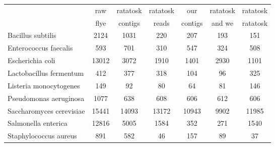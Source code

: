 \begin{minipage}{0.91\textwidth}
\begin{adjustbox}{center}
\begin{tabular}{|l||c|c|c|c|c|c|}
\hline
 & raw & ratatosk & ratatosk & our & ratatosk & ratatosk \\
 & flye & contigs & reads & contigs & and we & ratatosk \\
\hline
\hline
Bacillus subtilis & \cellcolor[RGB]{235, 71, 71} 2124 & \cellcolor[RGB]{235, 71, 71} 1031 & \cellcolor[RGB]{253, 241, 241} 220 & \cellcolor[RGB]{246, 246, 254} 207 & \cellcolor[RGB]{223, 223, 251} 193 & \cellcolor[RGB]{94, 94, 237} 151 \\
\hline
Enterococcus faecalis & \cellcolor[RGB]{253, 237, 237} 593 & \cellcolor[RGB]{250, 209, 209} 701 & \cellcolor[RGB]{218, 218, 251} 310 & \cellcolor[RGB]{254, 250, 250} 547 & \cellcolor[RGB]{218, 218, 251} 324 & \cellcolor[RGB]{250, 250, 254} 508 \\
\hline
Escherichia coli & \cellcolor[RGB]{235, 71, 71} 13012 & \cellcolor[RGB]{252, 232, 232} 3072 & \cellcolor[RGB]{241, 241, 253} 1910 & \cellcolor[RGB]{227, 227, 252} 1401 & \cellcolor[RGB]{253, 237, 237} 2930 & \cellcolor[RGB]{218, 218, 251} 1101 \\
\hline
Lactobacillus fermentum & \cellcolor[RGB]{252, 232, 232} 412 & \cellcolor[RGB]{253, 241, 241} 377 & \cellcolor[RGB]{255, 255, 255} 318 & \cellcolor[RGB]{218, 218, 251} 104 & \cellcolor[RGB]{218, 218, 251} 96 & \cellcolor[RGB]{255, 255, 255} 325 \\
\hline
Listeria monocytogenes & \cellcolor[RGB]{235, 71, 71} 149 & \cellcolor[RGB]{252, 232, 232} 92 & \cellcolor[RGB]{232, 232, 252} 80 & \cellcolor[RGB]{172, 172, 246} 64 & \cellcolor[RGB]{237, 237, 253} 81 & \cellcolor[RGB]{235, 71, 71} 146 \\
\hline
Pseudomonas aeruginosa & \cellcolor[RGB]{235, 71, 71} 1077 & \cellcolor[RGB]{235, 71, 71} 638 & \cellcolor[RGB]{241, 241, 253} 608 & \cellcolor[RGB]{227, 227, 252} 606 & \cellcolor[RGB]{253, 237, 237} 612 & \cellcolor[RGB]{227, 227, 252} 606 \\
\hline
Saccharomyces cerevisiae & \cellcolor[RGB]{247, 186, 186} 15441 & \cellcolor[RGB]{251, 218, 218} 14093 & \cellcolor[RGB]{253, 241, 241} 13172 & \cellcolor[RGB]{223, 223, 251} 10943 & \cellcolor[RGB]{205, 205, 249} 9902 & \cellcolor[RGB]{246, 246, 254} 11985 \\
\hline
Salmonella enterica & \cellcolor[RGB]{235, 71, 71} 12816 & \cellcolor[RGB]{235, 71, 71} 5005 & \cellcolor[RGB]{255, 255, 255} 1584 & \cellcolor[RGB]{218, 218, 251} 352 & \cellcolor[RGB]{218, 218, 251} 271 & \cellcolor[RGB]{255, 255, 255} 1540 \\
\hline
Staphylococcus aureus & \cellcolor[RGB]{235, 71, 71} 891 & \cellcolor[RGB]{235, 71, 71} 582 & \cellcolor[RGB]{227, 227, 252} 46 & \cellcolor[RGB]{253, 241, 241} 157 & \cellcolor[RGB]{241, 241, 253} 89 & \cellcolor[RGB]{223, 223, 251} 37 \\
\hline
\end{tabular}
\end{adjustbox}
\end{minipage}
